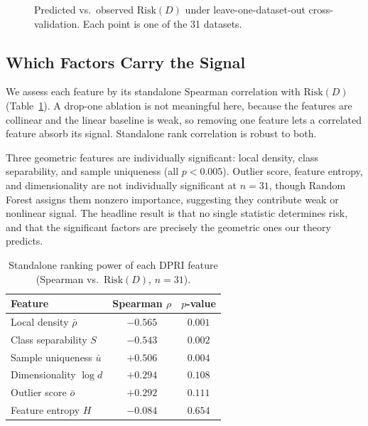 \begin{figure}[t]
  \centering
  \caption{Predicted vs.\ observed $\mathrm{Risk}(D)$ under
           leave-one-dataset-out cross-validation. Each point is one of the
           31 datasets.}
  \label{fig:regression}
\end{figure}

\subsection{Which Factors Carry the Signal}
\label{sec:single_factor}

We assess each feature by its standalone Spearman correlation with
$\mathrm{Risk}(D)$ (Table~\ref{tab:single_factor}). A drop-one ablation is
not meaningful here, because the features are collinear and the linear
baseline is weak, so removing one feature lets a correlated feature absorb
its signal. Standalone rank correlation is robust to both.

Three geometric features are individually significant: local density,
class separability, and sample uniqueness (all $p < 0.005$). Outlier score,
feature entropy, and dimensionality are not individually significant at
$n=31$, though Random Forest assigns them nonzero importance, suggesting
they contribute weak or nonlinear signal. The headline result is that
no single statistic determines risk, and that the significant factors are
precisely the geometric ones our theory predicts.

\begin{table}[t]
\centering
\caption{Standalone ranking power of each DPRI feature (Spearman vs.\
         $\mathrm{Risk}(D)$, $n=31$).}
\label{tab:single_factor}
\small
\begin{tabular}{lcc}
\toprule
\textbf{Feature} & \textbf{Spearman} $\rho$ & \textbf{$p$-value} \\
\midrule
Local density $\bar{\rho}$      & $-0.565$ & $0.001$ \\
Class separability $S$          & $-0.543$ & $0.002$ \\
Sample uniqueness $\bar{u}$     & $+0.506$ & $0.004$ \\
Dimensionality $\log d$         & $+0.294$ & $0.108$ \\
Outlier score $\bar{o}$         & $+0.292$ & $0.111$ \\
Feature entropy $H$             & $-0.084$ & $0.654$ \\
\bottomrule
\end{tabular}
\end{table}

